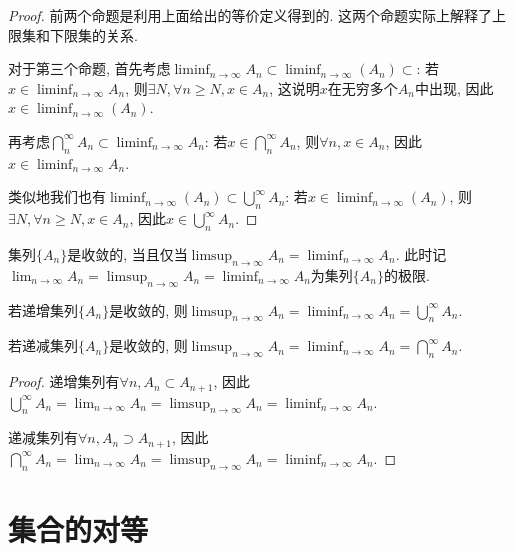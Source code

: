 \documentclass[theorem=false,mathfont=none,openany,sub3section]{easybook}
\begin{document}
\begin{proof}
  前两个命题是利用上面给出的等价定义得到的. 这两个命题实际上解释了上限集和下限集的关系.\par
  对于第三个命题, 首先考虑$\liminf_{n \to \infty}A_n\subset \liminf_{n \to \infty}(A_n)\subset$: 若$x\in \liminf_{n \to \infty}A_n$, 则$\exists N, \forall n\geqslant N, x\in A_n$, 这说明$x$在无穷多个$A_n$中出现, 因此$x\in \liminf_{n \to \infty}(A_n)$.\par
  再考虑$\bigcap_{n}^{\infty}A_n \subset \liminf_{n \to \infty}A_n$: 若$x\in \bigcap_{n}^{\infty}A_n$, 则$\forall n, x\in A_n$, 因此$x\in \liminf_{n \to \infty}A_n$.\par
  类似地我们也有$\liminf_{n \to \infty}(A_n)\subset \bigcup_{n}^{\infty}A_n$: 若$x\in \liminf_{n \to \infty}(A_n)$, 则$\exists N, \forall n\geqslant N, x\in A_n$, 因此$x\in \bigcup_{n}^{\infty}A_n$.\par
\end{proof}

\begin{definition}
  集列$\{A_n\}$是收敛的, 当且仅当$\limsup_{n \to \infty}A_n=\liminf_{n \to \infty}A_n$. 此时记$\lim_{n \to \infty} A_n=\limsup_{n \to \infty}A_n=\liminf_{n \to \infty}A_n$为集列$\{A_n\}$的极限.\par
\end{definition}

\begin{corollary}
  若递增集列$\{A_n\}$是收敛的, 则$\limsup_{n \to \infty}A_n=\liminf_{n \to \infty}A_n=\bigcup_{n}^{\infty}A_n$.\par
  若递减集列$\{A_n\}$是收敛的, 则$\limsup_{n \to \infty}A_n=\liminf_{n \to \infty}A_n=\bigcap_{n}^{\infty}A_n$.\par
\end{corollary}
\begin{proof}
  递增集列有$\forall n, A_n\subset A_{n+1}$, 因此$\bigcup_{n}^{\infty}A_n=\lim_{n \to \infty}A_n =\limsup_{n \to \infty}A_n=\liminf_{n \to \infty}A_n$.\par
  递减集列有$\forall n, A_n\supset A_{n+1}$, 因此$\bigcap_{n}^{\infty}A_n=\lim_{n \to \infty}A_n =\limsup_{n \to \infty}A_n=\liminf_{n \to \infty}A_n$.\par
\end{proof}

\newpage

\section{集合的对等}
\end{document}

